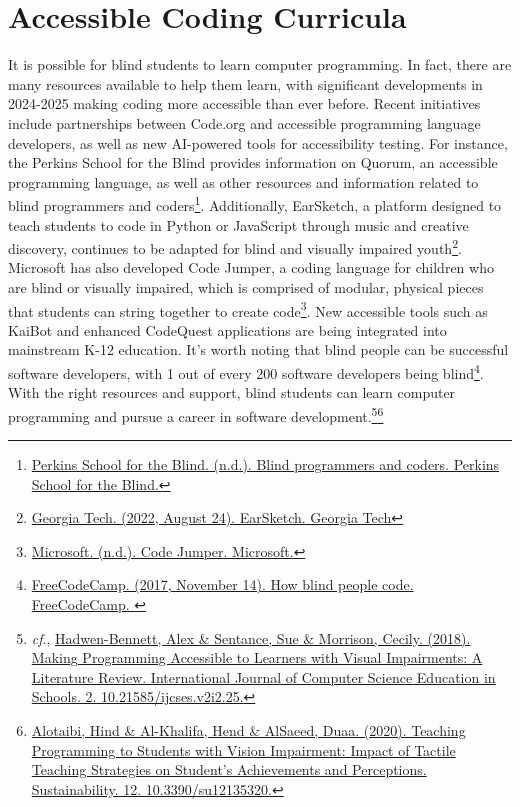 \hypertarget{appx8}{}\section[Accessible Coding Curricula]{Accessible Coding Curricula}\label{appx8}
It is possible for blind students to learn computer programming. In fact, there are many resources available to help them learn, with significant developments in 2024-2025 making coding more accessible than ever before. Recent initiatives include partnerships between Code.org and accessible programming language developers, as well as new AI-powered tools for accessibility testing. For instance, the Perkins School for the Blind provides information on Quorum, an accessible programming language, as well as other resources and information related to blind programmers and coders\footnote{\raggedright \href{https://www.perkins.org/stories/blind-programmers-and-coders}{Perkins School for the Blind. (n.d.). Blind programmers and coders. Perkins School for the Blind.}}. Additionally, EarSketch, a platform designed to teach students to code in Python or JavaScript through music and creative discovery, continues to be adapted for blind and visually impaired youth\footnote{\raggedright \href{https://earsketch.gatech.edu/}{Georgia Tech. (2022, August 24). EarSketch. Georgia Tech}}. Microsoft has also developed Code Jumper, a coding language for children who are blind or visually impaired, which is comprised of modular, physical pieces that students can string together to create code\footnote{\raggedright \href{https://www.microsoft.com/en-us/research/project/code-jumper/}{Microsoft. (n.d.). Code Jumper. Microsoft.} }. New accessible tools such as KaiBot and enhanced CodeQuest applications are being integrated into mainstream K-12 education. It's worth noting that blind people can be successful software developers, with 1 out of every 200 software developers being blind\footnote{\raggedright \href{https://www.freecodecamp.org/news/how-blind-people-code-fdb64e3bf5c/}{FreeCodeCamp. (2017, November 14). How blind people code. FreeCodeCamp. }}. With the right resources and support, blind students can learn computer programming and pursue a career in software development.\footnote{\raggedright \emph{cf}., \href{https://files.eric.ed.gov/fulltext/EJ1207407.pdf}{Hadwen-Bennett, Alex \& Sentance, Sue \& Morrison, Cecily. (2018). Making Programming Accessible to Learners with Visual Impairments: A Literature Review. International Journal of Computer Science Education in Schools. 2. 10.21585/ijcses.v2i2.25.}}\footnote{\raggedright \href{https://www.mdpi.com/2071-1050/12/13/5320}{Alotaibi, Hind \& Al-Khalifa, Hend \& AlSaeed, Duaa. (2020). Teaching Programming to Students with Vision Impairment: Impact of Tactile Teaching Strategies on Student's Achievements and Perceptions. Sustainability. 12. 10.3390/su12135320.}}

